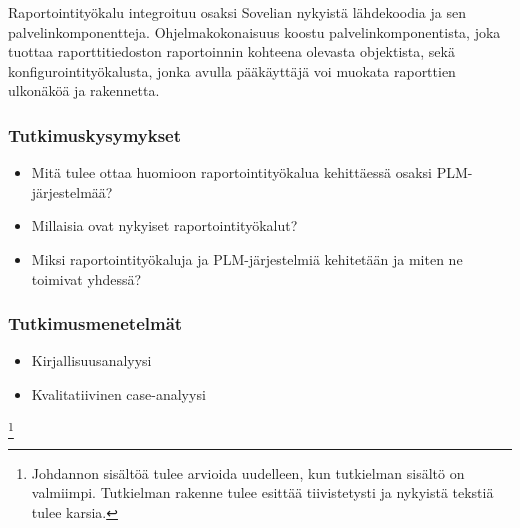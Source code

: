 Raportointityökalu integroituu osaksi Sovelian nykyistä lähdekoodia ja sen palvelinkomponentteja. Ohjelmakokonaisuus koostu palvelinkomponentista, joka tuottaa raporttitiedoston raportoinnin kohteena olevasta objektista, sekä konfigurointityökalusta, jonka avulla pääkäyttäjä voi muokata raporttien ulkonäköä ja rakennetta.

\subsubsection{Tutkimuskysymykset}
\begin{itemize}
\item Mitä tulee ottaa huomioon raportointityökalua kehittäessä osaksi PLM-järjestelmää?
\item Millaisia ovat nykyiset raportointityökalut?
\item Miksi raportointityökaluja ja PLM-järjestelmiä kehitetään ja miten ne toimivat yhdessä?
\end{itemize}

\subsubsection{Tutkimusmenetelmät}
\begin{itemize}
\item Kirjallisuusanalyysi
\item Kvalitatiivinen case-analyysi
\end{itemize}

\footnote{Johdannon sisältöä tulee arvioida uudelleen, kun tutkielman sisältö on valmiimpi. Tutkielman rakenne tulee esittää tiivistetysti ja nykyistä tekstiä tulee karsia.}
